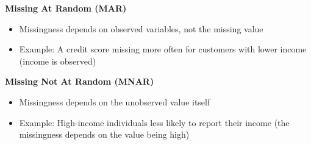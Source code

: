 \documentclass[11pt,a4paper]{article}
\begin{document}
\noindent\textbf{Missing At Random (MAR)}
\begin{itemize}
    \item Missingness depends on observed variables, not the missing value
    \item Example: A credit score missing more often for customers with lower income (income is observed)
\end{itemize}

\noindent\textbf{Missing Not At Random (MNAR)}
\begin{itemize}
    \item Missingness depends on the unobserved value itself
    \item Example: High-income individuals less likely to report their income (the missingness depends on the value being high)
\end{itemize}

\vspace{0.35cm}
\end{document}
